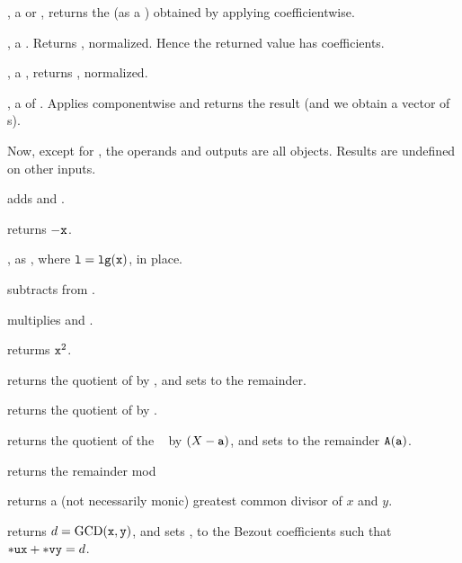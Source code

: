 ,  a  or ,
returns the  (as a ) obtained by applying 
coefficientwise.

,  a . Returns , normalized. Hence the returned value has 
coefficients.

,  a , returns , normalized.

,  a  of . Applies
 componentwise and returns the result (and we obtain a vector
of s).

\noindent Now, except for , the operands and outputs are all 
objects. Results are undefined on other inputs.

 adds  and . 

 returns $-{\tt x}$.

, as , where
${\tt l} = {\tt lg(x)}$, in place.

 subtracts  from . 

 multiplies  and . 

 returms ${\tt x}^2$. 

 returns the quotient
of  by , and sets  to the remainder.

 returns the quotient of  by
.

 returns the
quotient of the ~ by $(X - {\tt a})$, and sets  to the
remainder ${\tt A}({\tt a})$.

 returns the remainder  mod

 returns a (not necessarily monic)
greatest common divisor of $x$  and $y$.

 returns
$d = {\rm GCD}({\tt x},{\tt y})$, and sets ,  to the Bezout
coefficients such that ${\tt *ux} + {\tt *vy} = d$.

